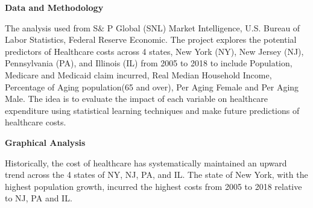 \documentclass[12pt]{article}
\begin{document}
\vspace{\baselineskip}

\vspace{\baselineskip}

\vspace{\baselineskip}

\vspace{\baselineskip}

\vspace{\baselineskip}
\begin{adjustwidth}{2.75in}{0.0in}
\begin{justify}
\textbf{Data and Methodology}
\end{justify}\par

\end{adjustwidth}

\begin{justify}
The analysis used from S$\&$ P Global (SNL) Market Intelligence, U.S. Bureau of Labor Statistics, Federal Reserve Economic. The project explores the potential predictors of Healthcare costs across 4 states, New York (NY), New Jersey (NJ), Pennsylvania (PA), and Illinois (IL) from 2005 to 2018 to include Population, Medicare and Medicaid claim incurred, Real Median Household Income, Percentage of Aging population(65 and over), Per Aging Female and Per Aging Male. The idea is to evaluate the impact of each variable on healthcare expenditure using statistical learning techniques and make future predictions of healthcare costs.
\end{justify}\par


\vspace{\baselineskip}
\begin{adjustwidth}{2.0in}{0.0in}
\begin{justify}
\textbf{Graphical Analysis}
\end{justify}\par

\end{adjustwidth}

\begin{justify}
Historically, the cost of healthcare has systematically maintained an upward trend across the 4 states of NY, NJ, PA, and IL. The state of New York, with the highest population growth, incurred the highest costs from 2005 to 2018 relative to NJ, PA and IL.
\end{justify}\par
\end{document}
